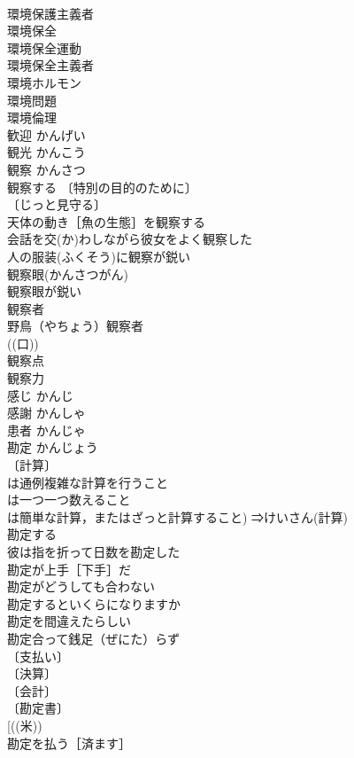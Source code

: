 \documentclass[8pt]{extreport}
\begin{document}
\begin{CJK}{UTF8}{min}
\\	環境保護主義者 
\\	環境保全 
\\	環境保全運動 
\\	環境保全主義者 
\\	環境ホルモン 
\\	環境問題 
\\	環境倫理 
\\	歓迎	かんげい	
\\	観光	かんこう	
\\	観察	かんさつ	
\\	観察する 〔特別の目的のために〕
\\	〔じっと見守る〕
\\	天体の動き［魚の生態］を観察する 
\\	会話を交(か)わしながら彼女をよく観察した 
\\	人の服装(ふくそう)に観察が鋭い 
\\	観察眼(かんさつがん) 
\\	観察眼が鋭い 
\\	観察者 
\\	野鳥（やちょう）観察者 
\\	((口)) 
\\	観察点 
\\	観察力 
\\	感じ	かんじ	
\\	感謝	かんしゃ	
\\	患者	かんじゃ	
\\	勘定	かんじょう	
\\	〔計算〕
\\	は通例複雑な計算を行うこと
\\	は一つ一つ数えること
\\	は簡単な計算，またはざっと計算すること) ⇒けいさん(計算)
\\	勘定する 
\\	彼は指を折って日数を勘定した 
\\	勘定が上手［下手］だ 
\\	勘定がどうしても合わない 
\\	勘定するといくらになりますか 
\\	勘定を間違えたらしい 
\\	勘定合って銭足（ぜにた）らず 
\\	〔支払い〕
\\	〔決算〕
\\	〔会計〕
\\	〔勘定書〕
\\	[((米)) 
\\	勘定を払う［済ます］ 

\end{CJK}
\end{document}
